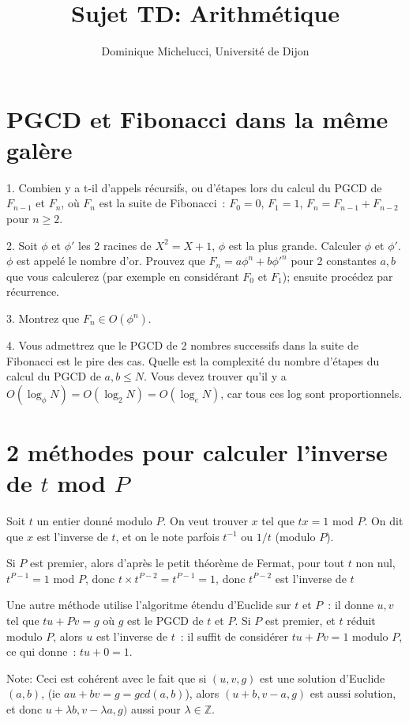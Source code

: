 \documentclass[a4paper]{article}
\def\Z{\mathbb{Z}}
\begin{document}
\title{Sujet TD:  Arithm\'etique } 
\author{Dominique Michelucci, Universit\'e de Dijon}
\date{}
\maketitle

\section{PGCD et  Fibonacci dans la m\^eme gal\`ere}

1. Combien y a t-il d'appels r\'ecursifs, ou d'\'etapes lors du calcul du PGCD de $F_{n-1}$ et $F_n$,
o\`u $F_n$ est la suite de Fibonacci~: $F_0=0$, $F_1=1$, $F_n=F_{n-1}+F_{n-2}$ pour $n\ge 2$.

2. Soit $\phi$ et $\phi'$ les 2 racines de $X^2=X+1$, $\phi$ est la plus grande.
Calculer $\phi$ et $\phi'$.
$\phi$ est appel\'e le nombre d'or.
Prouvez que $F_n= a \phi^n + b \phi'^n$ pour 2 constantes $a, b$ que vous calculerez
(par exemple en consid\'erant  $F_0$ et $F_1$); ensuite proc\'edez par r\'ecurrence.

3. Montrez que $F_n \in O(\phi^n)$.

4.  Vous admettrez que le PGCD de 2 nombres successifs dans la suite de Fibonacci est le pire des cas.
Quelle est la complexit\'e du nombre d'\'etapes du calcul du  PGCD de $a, b\le N$.
Vous devez trouver qu'il y a $O(\log_{\phi} N)=O(\log_2 N)= O(\log_e N)$, car tous ces log sont proportionnels.


\section{2 m\'ethodes pour calculer l'inverse de $t$ mod $P$}
Soit $t$ un entier donn\'e modulo $P$. On veut trouver $x$ tel que $tx=1$ mod $P$. 
On dit que $x$ est l'inverse de $t$, et on le note parfois $t^{-1}$ ou $1/t$ (modulo $P$).

Si $P$ est premier, alors d'apr\`es le petit th\'eor\`eme de Fermat, pour tout $t$ non nul, $t^{P-1}=1$ mod $P$, donc $t\times t^{P-2}= t^{P-1}=1$, donc $t^{P-2}$ est l'inverse de $t$

Une autre m\'ethode utilise l'algoritme \'etendu d'Euclide sur $t$ et $P$~:
il donne $u, v$ tel que $tu + Pv= g$ o\`u $g$ est le PGCD de $t$ et $P$.
Si $P$ est premier, et $t$ r\'eduit modulo $P$, alors $u$ est l'inverse  de $t$~:
il suffit de consid\'erer $tu + Pv= 1$ modulo $P$, ce qui donne~: $tu+0=1$.

Note: Ceci est coh\'erent avec le fait que si $(u, v, g)$ est une solution d'Euclide$(a,b)$,
(ie $au+bv=g=gcd(a,b)$),
alors $(u+b,v-a,g)$ est aussi solution, et donc $u+\lambda b, v- \lambda a, g)$ aussi pour $\lambda\in \Z$. 
\end{document}
